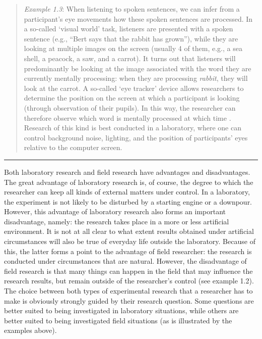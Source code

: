 \documentclass[
]{book}
\begin{document}
\begin{quote}
\emph{Example 1.3}: When listening to spoken sentences, we can infer from a participant's eye movements how these spoken sentences are processed. In a so-called `visual world' task, listeners are presented with a spoken sentence (e.g., ``Bert says that the rabbit has grown''), while they are looking at multiple images on the screen (usually 4 of them, e.g., a sea shell, a peacock, a saw, and a carrot). It turns out that listeners will predominantly be looking at the image associated with the word they are currently mentally processing: when they are processing \emph{rabbit}, they will look at the carrot. A so-called `eye tracker' device allows researchers to determine the position on the screen at which a participant is looking (through observation of their pupils). In this way, the researcher can therefore observe which word is mentally processed at which time \citep{KMR12}. Research of this kind is best conducted in a laboratory, where one can control background noise, lighting, and the position of participants' eyes relative to the computer screen.
\end{quote}

\begin{center}\rule{0.5\linewidth}{0.5pt}\end{center}

Both laboratory research and field research have advantages and disadvantages. The great advantage of laboratory research is, of course, the degree to which the researcher can keep all kinds of external matters under control. In a laboratory, the experiment is not likely to be disturbed by a starting engine or a downpour. However, this advantage of laboratory research also forms an important disadvantage, namely: the research takes place in a more or less artificial environment. It is not at all clear to what extent results obtained under artificial circumstances will also be true of everyday life outside the laboratory. Because of this, the latter forms a point to the advantage of field researcher: the research is conducted under circumstances that are natural. However, the disadvantage of field research is that many things can happen in the field that may influence the research results, but remain outside of the researcher's control (see example 1.2). The choice between both types of experimental research that a researcher has to make is obviously strongly guided by their research question. Some questions are better suited to being investigated in laboratory situations, while others are better suited to being investigated field situations (as is illustrated by the examples above).
\end{document}
